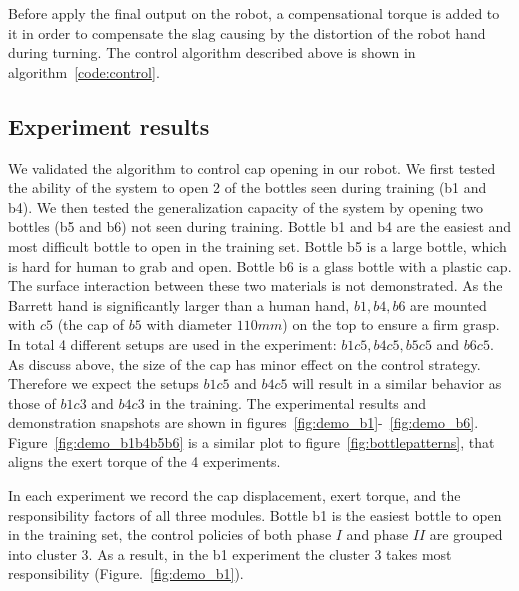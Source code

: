 Before apply the final output on the robot, a compensational torque is added to it in order to compensate the slag causing by the distortion of the robot hand during turning. The control algorithm described above is shown in algorithm~\ref{code:control}.



\subsection{Experiment results}



We validated the algorithm to control cap opening in our robot. We first tested the ability of the system to open 2 of the bottles seen during training (b1 and b4). We then tested the generalization capacity of the system by opening two bottles (b5 and b6) not seen during training.
Bottle b1 and b4 are the easiest and most difficult bottle to open in the training set.
Bottle b5 is a large bottle, which is hard for human to grab and open. Bottle b6 is a glass bottle with a plastic cap. The surface interaction between these two materials is not demonstrated. As the Barrett hand is significantly larger than a human hand, $b1, b4, b6$ are mounted with $c5$ (the cap of $b5$ with diameter $110 mm$) on the top to ensure a firm grasp. In total 4 different setups are used in the experiment: $b1c5, b4c5, b5c5$ and $b6c5$. As discuss above, the size of the cap has minor effect on the control strategy. Therefore we expect the setups $b1c5$ and $b4c5$ will result in a similar behavior as those of $b1c3$ and $b4c3$ in the training. The experimental results and demonstration snapshots are shown in figures~\ref{fig:demo_b1}-~\ref{fig:demo_b6}. Figure~\ref{fig:demo_b1b4b5b6} is a similar plot to figure~\ref{fig:bottlepatterns}, that aligns the exert torque of the 4 experiments.

In each experiment we record the cap displacement, exert torque, and the responsibility factors of all three modules. Bottle b1 is the easiest bottle to open in the training set, the control policies of both phase $I$ and phase $II$ are grouped into cluster 3. As a result, in the b1 experiment the cluster 3 takes most responsibility (Figure.~\ref{fig:demo_b1}).

